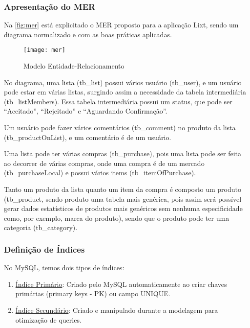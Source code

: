 \subsubsection{Apresentação do MER}

Na \autoref{fig:mer} está explicitado o MER proposto para a aplicação Lixt, sendo um diagrama normalizado e com as boas práticas aplicadas.

\begin{figure}[H]
  \centering
  \caption{Modelo Entidade-Relacionamento}
  \label{fig:mer}
  \texttt{[image: mer]}
\end{figure}

No diagrama, uma lista (tb\_list) possui vários usuário (tb\_user), e um usuário pode estar em várias listas, surgindo assim a necessidade da tabela intermediária (tb\_listMembers). Essa tabela intermediária possui um status, que pode ser ``Aceitado'', ``Rejeitado'' e ``Aguardando Confirmação''.

Um usuário pode fazer vários comentários (tb\_comment) no produto da lista (tb\_productOnList), e um comentário é de um usuário.

Uma lista pode ter várias compras (tb\_purchase), pois uma lista pode ser feita ao decorrer de várias compras, onde uma compra é de um mercado (tb\_purchaseLocal) e possui vários items (tb\_itemOfPurchase).

Tanto um produto da lista quanto um item da compra é 
composto um produto (tb\_product, sendo produto uma tabela mais genérica, pois assim será possível gerar dados estatísticos de produtos mais genéricos sem nenhuma especificidade como, por exemplo, marca do produto), sendo que o produto pode ter uma categoria (tb\_category).

\subsubsection{Definição de Índices}

No MySQL, temos dois tipos de índices:

\begin{enumerate}
	\item \underline{Índice Primário}: Criado pelo MySQL automaticamente ao criar chaves primárias (primary keys - PK) ou campo UNIQUE.
	\item \underline{Índice Secundário}: Criado e manipulado durante a modelagem para otimização de queries.
\end{enumerate}	

